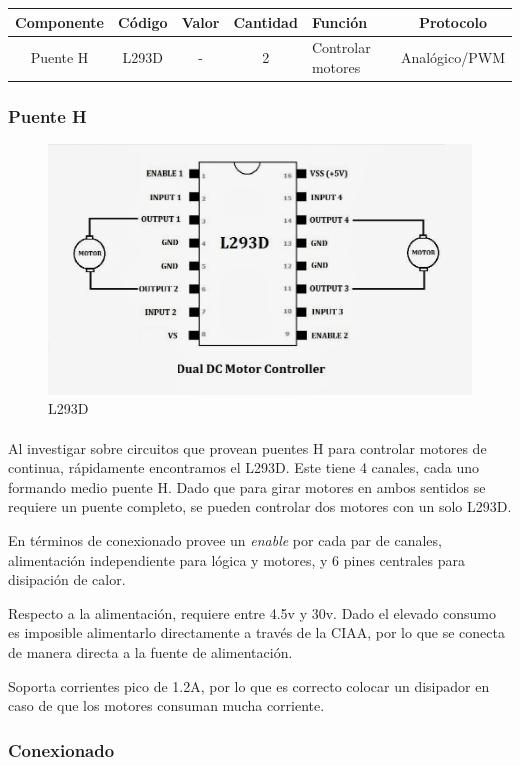 \begin{longtable}[]{|c|c|c|c|p{3.2cm}|c|}
	\toprule
	Componente & Código & Valor & Cantidad & Función &
	Protocolo\tabularnewline
	\midrule
	\endhead
	Puente H & L293D & - & 2 & Controlar motores &
	Analógico/PWM\tabularnewline
	\bottomrule
\end{longtable}

\subsubsection{Puente H}

\begin{figure}[H]
	\centering
	\includegraphics[width=0.7\linewidth]{informe_2/encapsulado_L293D}
	\caption{L293D}
	\label{fig:encapsuladol293d}
\end{figure}

\paragraph{}Al investigar sobre circuitos que provean puentes H para controlar motores de
continua, rápidamente encontramos el L293D. Este tiene 4 canales, cada uno
formando medio puente H. Dado que para girar motores en ambos sentidos se
requiere un puente completo, se pueden controlar dos motores con un solo
L293D.

En términos de conexionado provee un \emph{enable} por cada par de canales,
alimentación independiente para lógica y motores, y 6 pines centrales para
disipación de calor.

Respecto a la alimentación, requiere entre 4.5v y 30v. Dado el elevado consumo
es imposible alimentarlo directamente a través de la CIAA, por lo que se conecta  
de manera directa a la fuente de alimentación.

Soporta corrientes pico de 1.2A, por lo que es correcto colocar un disipador en
caso de que los motores consuman mucha corriente.

\subsubsection{Conexionado}

